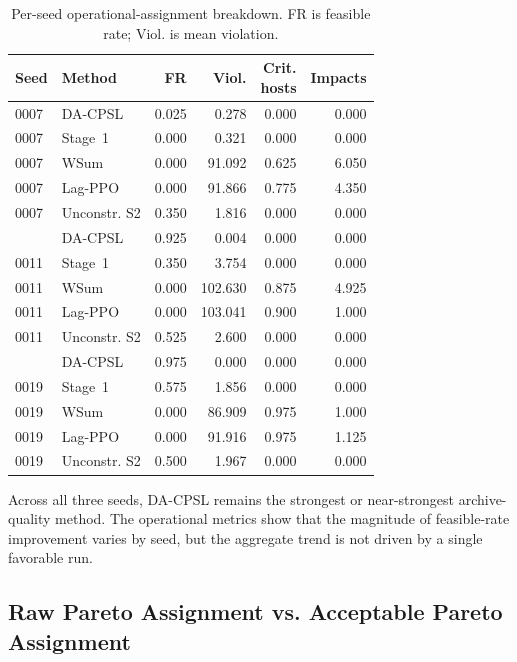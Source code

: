 \documentclass[sigconf,review,anonymous]{acmart}
\begin{document}
\begin{table}[!htbp]
\centering
\caption{Per-seed operational-assignment breakdown. FR is feasible rate; Viol. is mean violation.}
\label{tab:app-per-seed-operational-assignment}
\begingroup
\scriptsize
\setlength{\tabcolsep}{2.3pt}
\renewcommand{\arraystretch}{1.08}
\begin{tabular*}{\columnwidth}{@{\extracolsep{\fill}}llrrrr@{}}
\toprule
Seed & Method & FR & Viol. & \shortstack{Crit.\\hosts} & Impacts \\
\midrule
0007 & DA-CPSL & 0.025 & 0.278 & 0.000 & 0.000 \\
0007 & Stage~1 & 0.000 & 0.321 & 0.000 & 0.000 \\
0007 & WSum & 0.000 & 91.092 & 0.625 & 6.050 \\
0007 & Lag-PPO & 0.000 & 91.866 & 0.775 & 4.350 \\
0007 & Unconstr. S2 & 0.350 & 1.816 & 0.000 & 0.000 \\
\addlinespace[1pt]
0011 & DA-CPSL & 0.925 & 0.004 & 0.000 & 0.000 \\
0011 & Stage~1 & 0.350 & 3.754 & 0.000 & 0.000 \\
0011 & WSum & 0.000 & 102.630 & 0.875 & 4.925 \\
0011 & Lag-PPO & 0.000 & 103.041 & 0.900 & 1.000 \\
0011 & Unconstr. S2 & 0.525 & 2.600 & 0.000 & 0.000 \\
\addlinespace[1pt]
0019 & DA-CPSL & 0.975 & 0.000 & 0.000 & 0.000 \\
0019 & Stage~1 & 0.575 & 1.856 & 0.000 & 0.000 \\
0019 & WSum & 0.000 & 86.909 & 0.975 & 1.000 \\
0019 & Lag-PPO & 0.000 & 91.916 & 0.975 & 1.125 \\
0019 & Unconstr. S2 & 0.500 & 1.967 & 0.000 & 0.000 \\
\bottomrule
\end{tabular*}
\endgroup
\end{table}

Across all three seeds, DA-CPSL remains the strongest or near-strongest
archive-quality method. The operational metrics show that the magnitude
of feasible-rate improvement varies by seed, but the aggregate trend is
not driven by a single favorable run.

\subsection{Raw Pareto Assignment vs. Acceptable Pareto Assignment}
\label{app:raw-vs-acceptable-assignment}
\end{document}
